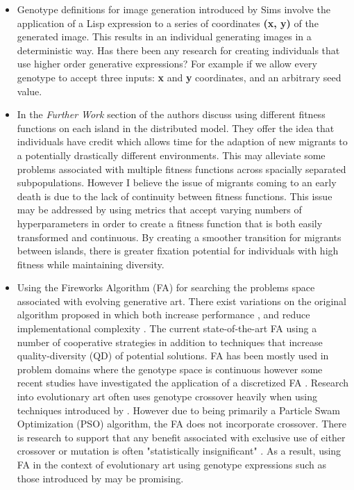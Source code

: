 \documentclass[10pt,a4paper]{article}
\begin{document}
\begin{itemize}
	\item Genotype definitions for image generation introduced by Sims \cite{sims} involve the application of a Lisp expression to a series of coordinates \textbf{(x, y)} of the generated image.
	This results in an individual generating images in a deterministic way.
	Has there been any research for creating individuals that use higher order generative expressions?
	For example if we allow every genotype to accept three inputs: \textbf{x} and \textbf{y} coordinates, and an arbitrary seed value.
	
	\item In the \textit{Further Work} section of \cite{distributed-evolutionary-art} the authors discuss using different fitness functions on each island in the distributed model.
	They offer the idea that individuals have credit which allows time for the adaption of new migrants to a potentially drastically different environments.
	This may alleviate some problems associated with multiple fitness functions across spacially separated subpopulations.
	However I believe the issue of migrants coming to an early death is due to the lack of continuity between fitness functions.
	This issue may be addressed by using metrics that accept varying numbers of hyperparameters in order to create a fitness function that is both easily transformed and continuous.
	By creating a smoother transition for migrants between islands, there is greater fixation potential for individuals with high fitness while maintaining diversity.
	
	\item Using the Fireworks Algorithm (FA) \cite{fireworks} for searching the problems space associated with evolving generative art.
	There exist variations on the original algorithm proposed in \cite{fireworks} which both increase performance \cite{fireworks-adaptive, fireworks-enhanced, fireworks-cooperative}, and reduce implementational complexity \cite{fireworks-bare-bones}.
	The current state-of-the-art FA using a number of cooperative strategies \cite{fireworks-cooperative} in addition to techniques that increase quality-diversity (QD) of potential solutions.
	FA has been mostly used in problem domains where the genotype space is continuous however some recent studies have investigated the application of a discretized FA \cite{fireworks-discrete-combinatorial, fireworks-discrete-tsp}.
	Research into evolutionary art often uses genotype crossover heavily when using techniques introduced by \cite{sims}.
	However due to being primarily a Particle Swam Optimization (PSO) algorithm, the FA does not incorporate crossover.
	There is research to support that any benefit associated with exclusive use of either crossover or mutation is often "statistically insignificant" \cite{mutation-vs-crossover,mutation-vs-crossover-revised}.
	As a result, using FA in the context of evolutionary art using genotype expressions such as those introduced by \cite{sims} may be promising.
	
	
	
\end{itemize}
\end{document}
